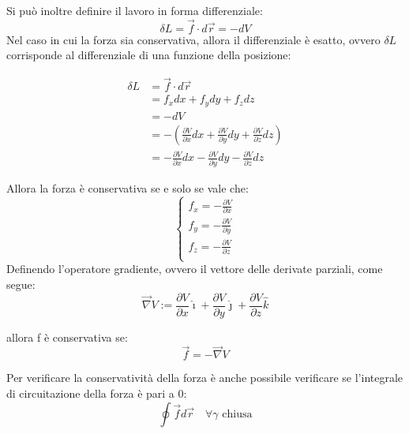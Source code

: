 \documentclass[11pt, a4paper, openright]{book}
\theoremstyle{plain}
\theoremstyle{definition}
\begin{document}
Si può inoltre definire il lavoro in forma differenziale:
\[\delta L = \vec{f}\cdot d\vec{r} = -dV\]
Nel caso in cui la forza sia conservativa, allora il differenziale è esatto, ovvero $\delta L$ corrisponde al differenziale di una funzione della posizione:

\begin{align}
    \delta L & = \vec{f} \cdot d\vec{r} \\
    & = f_xdx  + f_ydy + f_zdz \\
    & = -dV \\
    & = -(\frac{\partial V}{\partial x} dx + \frac{\partial V}{\partial y} dy + \frac{\partial V}{\partial z} dz) \\ 
    & = -\frac{\partial V}{\partial x} dx - \frac{\partial V}{\partial y} dy - \frac{\partial V}{\partial z} dz 
\end{align}

Allora la forza è conservativa se e solo se vale che:
\[\begin{cases}
        \displaystyle f_x = -\frac{\partial V}{\partial x} \\[1em]
        \displaystyle f_y = -\frac{\partial V}{\partial y} \\[1em]
        \displaystyle f_z = -\frac{\partial V}{\partial z} \\[1em]
    \end{cases}
\]
Definendo l'operatore gradiente, ovvero il vettore delle derivate parziali, come segue:
\[\vec{\nabla}V :=  \frac{\partial V}{\partial x}\hat{\imath} + \frac{\partial V}{\partial y}\hat{\jmath} + \frac{\partial V}{\partial z}\hat{k}\]

allora f è conservativa se:
\[\vec{f} = -\vec{\nabla}V\]

Per verificare la conservatività della forza è anche possibile verificare se l'integrale di circuitazione della forza è pari a 0:
\[\oint \vec{f} d\vec{r} \quad \forall \gamma \text{ chiusa}\]
\end{document}
